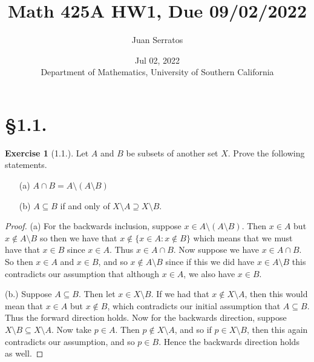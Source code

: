 \documentclass[9pt,reqno]{amsart}
\title{Math 425A HW1, Due 09/02/2022}
\author{Juan Serratos}
\date{Jul 02, 2022 \\ {Department of Mathematics, University of Southern California}}
\theoremstyle{definition}
\newtheorem{exercise}{Exercise}[section]
\begin{document}
\maketitle
\setcounter{tocdepth}{4}
\setcounter{secnumdepth}{4}
\section{\S 1.1.}
\begin{exercise}[1.1.] Let $A$ and $B$ be subsets of another set $X$. Prove the following statements.
\begin{itemize}
	\item [(a)] $A \cap B = A\setminus (A \setminus B)$
	\item [(b)] $A \subseteq B$ if and only of $X \setminus A \supseteq X \setminus B$.
\end{itemize}
\end{exercise}

\begin{proof} (a) For the backwards inclusion, suppose $x \in A \setminus (A\setminus B)$. Then $x \in A$ but $x \notin A \setminus B$ so then we have that $x \notin \{ x \in A \colon x \notin B \}$ which means that we must have that $x \in B$ since $x \in A$. Thus $x \in A \cap B$. Now suppose we have $x \in A \cap B$. So then $x \in A$ and $x \in B$, and so $x \notin A \setminus B$ since if this we did have $x \in A \setminus B$ this contradicts our assumption that although $x \in A$, we also have $x \in B$. 

(b.) Suppose $A \subseteq B$. Then let $x \in X \setminus B$. If we had that $x \notin X \setminus A$, then this would mean that $x \in A$ but $x \notin B$, which contradicts our initial assumption that $A \subseteq B$. Thus the forward direction holds. Now for the backwards direction, suppose $X \setminus B \subseteq X \setminus A$. Now take $p \in A$. Then $p \notin X \setminus A$, and so if $p \in X \setminus B$, then this again contradicts our assumption, and so $p \in B$. Hence the backwards direction holds as well. 
\end{proof}
\end{document}
